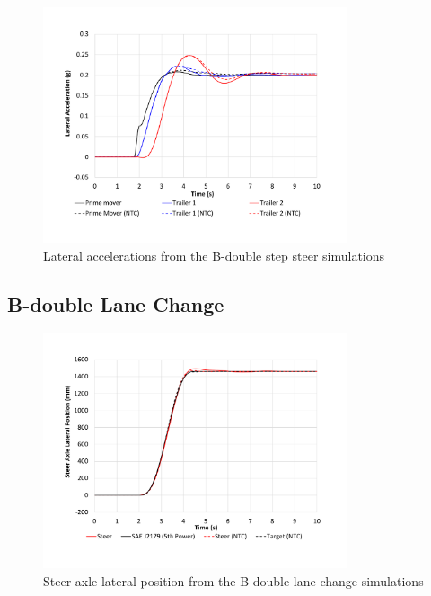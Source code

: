     \begin{figure}[H]
        \centering
        \includegraphics[width=0.8\textwidth]{fig/ntc-b-double_ssc}
        \caption{Lateral accelerations from the B-double step steer simulations}
        \label{figure:ntc-b-double_ssc}
    \end{figure}

\subsection{B-double Lane Change}\label{appendix:b-double-validation-lc}

    \begin{figure}[H]
        \centering
        \includegraphics[width=0.8\textwidth]{fig/ntc-b-double_lca}
        \caption{Steer axle lateral position from the B-double lane change simulations}
        \label{figure:ntc-b-double_lca}
    \end{figure}

